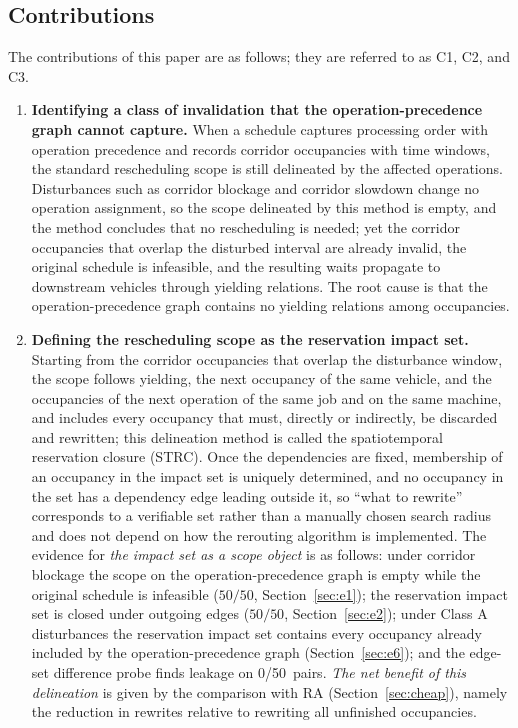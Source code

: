 \documentclass[manuscript,screen,review]{acmart}
\providecommand{\STRC}{\textsc{STRC}}
\newcommand{\NPairs}{50}
\newcommand{\PassMiss}{\NPairs/\NPairs}      %
\newcommand{\PassClosed}{\NPairs/\NPairs}    %
\newcommand{\ProbeLeakPairs}{0/50}
\begin{document}
\subsection{Contributions}
\label{sec:contributions}

The contributions of this paper are as follows; they are referred to as C1, C2, and C3.

\begin{enumerate}[label=\textbf{C\arabic*.},leftmargin=2.2em,itemsep=0.4em]
\item \textbf{Identifying a class of invalidation that the operation-precedence graph cannot capture.}
When a schedule captures processing order with operation precedence and records corridor occupancies with time windows,
the standard rescheduling scope is still delineated by the affected operations.
Disturbances such as corridor blockage and corridor slowdown change no operation assignment,
so the scope delineated by this method is empty, and the method concludes that no rescheduling is needed;
yet the corridor occupancies that overlap the disturbed interval are already invalid, the original schedule is infeasible,
and the resulting waits propagate to downstream vehicles through yielding relations.
The root cause is that the operation-precedence graph contains no yielding relations among occupancies.

\item \textbf{Defining the rescheduling scope as the reservation impact set.}
Starting from the corridor occupancies that overlap the disturbance window,
the scope follows yielding, the next occupancy of the same vehicle, and the occupancies of the next operation of the same job and on the same machine,
and includes every occupancy that must, directly or indirectly, be discarded and rewritten; this delineation method is called the spatiotemporal reservation closure (\STRC).
Once the dependencies are fixed, membership of an occupancy in the impact set is uniquely determined,
and no occupancy in the set has a dependency edge leading outside it, so ``what to rewrite'' corresponds to a verifiable set
rather than a manually chosen search radius and does not depend on how the rerouting algorithm is implemented.
The evidence for \emph{the impact set as a scope object} is as follows: under corridor blockage the scope on the operation-precedence graph is empty
while the original schedule is infeasible (\(\PassMiss\), Section~\ref{sec:e1}); the reservation impact set is closed under outgoing edges (\(\PassClosed\),
Section~\ref{sec:e2}); under Class A disturbances the reservation impact set contains every occupancy already included by the operation-precedence graph (Section~\ref{sec:e6});
and the edge-set difference probe finds leakage on \ProbeLeakPairs\ pairs.
\emph{The net benefit of this delineation} is given by the comparison with RA (Section~\ref{sec:cheap}),
namely the reduction in rewrites relative to rewriting all unfinished occupancies.


\end{enumerate}
\end{document}
